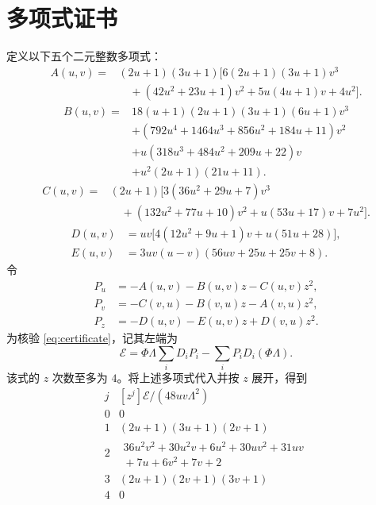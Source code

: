 \documentclass[a4paper,11pt]{article}
\numberwithin{equation}{section}
\theoremstyle{chinese}
\begin{document}
\appendix
\section{多项式证书}\label{sec:certificate}
定义以下五个二元整数多项式：
\begin{equation}\label{eq:polyA}
\begin{split}
A(u,v)={}&(2u+1)(3u+1)\bigl[
6(2u+1)(3u+1)v^3\\
&\quad +(42u^2+23u+1)v^2+5u(4u+1)v+4u^2\bigr].
\end{split}
\end{equation}
\begin{equation}\label{eq:polyB}
\begin{split}
B(u,v)={}&18(u+1)(2u+1)(3u+1)(6u+1)v^3\\
&+(792u^4+1464u^3+856u^2+184u+11)v^2\\
&+u(318u^3+484u^2+209u+22)v\\
&+u^2(2u+1)(21u+11).
\end{split}
\end{equation}
\begin{equation}\label{eq:polyC}
\begin{split}
C(u,v)={}&(2u+1)\bigl[3(36u^2+29u+7)v^3\\
&\quad +(132u^2+77u+10)v^2+u(53u+17)v+7u^2\bigr].
\end{split}
\end{equation}
\begin{align}
D(u,v)&=uv\bigl[4(12u^2+9u+1)v+u(51u+28)\bigr],\label{eq:polyD}\\
E(u,v)&=3uv(u-v)(56uv+25u+25v+8).\label{eq:polyE}
\end{align}
令
\begin{equation}\label{eq:polysP}
\begin{aligned}
P_u&=-A(u,v)-B(u,v)z-C(u,v)z^2,\\
P_v&=-C(v,u)-B(v,u)z-A(v,u)z^2,\\
P_z&=-D(u,v)-E(u,v)z+D(v,u)z^2.
\end{aligned}
\end{equation}
为核验 \eqref{eq:certificate}，记其左端为
\[
\mathcal E=\Phi \Lambda\sum_iD_iP_i-\sum_iP_iD_i(\Phi \Lambda).
\]
该式的 $z$ 次数至多为 $4$。将上述多项式代入并按 $z$ 展开，得到
\begin{equation}\label{eq:certificate-table}
\begin{array}{c|l}
j&[z^j]\mathcal E/(48uv\Lambda^2)\\ \hline
0&0\\
1&(2u+1)(3u+1)(2v+1)\\
2&\begin{aligned}36u^2v^2+30u^2v+6u^2+30uv^2+31uv\\{}+7u+6v^2+7v+2\end{aligned}\\
3&(2u+1)(2v+1)(3v+1)\\
4&0
\end{array}
\end{equation}
\end{document}
